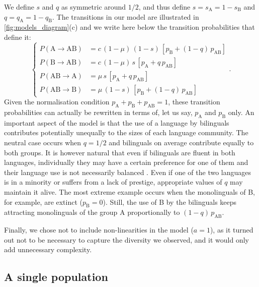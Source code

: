 \documentclass[../thesis.tex]{subfiles}
\begin{document}
We define $s$ and $q$ as symmetric around $1/2$, and thus define $s = s_\text{A} = 1 -
s_\text{B}$ and $q = q_\text{A} = 1 - q_\text{B}$. The transitions in our model are
illustrated in \cref{fig:models_diagram}(c) and we write here below the transition
probabilities that define it:
\begin{equation}
\label{eq:bipref_model}
\left\{
\begin{aligned}
    P (\text{A} \rightarrow \text{AB}) &= c \, (1 - \mu) \, (1-s) \, \left[ p_{\text{B}} + (1-q) \,  p_{\text{AB}} \right] \\
    P (\text{B} \rightarrow \text{AB}) &= c \, (1 - \mu) \, s \, \left[ p_{\text{A}} + q \, p_{\text{AB}} \right] \\
    P (\text{AB} \rightarrow \text{A}) &= \mu \, s \, \left[ p_{\text{A}} + q \, p_{\text{AB}} \right] \\
    P (\text{AB} \rightarrow \text{B}) &= \mu \, (1-s) \, \left[ p_{\text{B}} + (1-q) \, p_{\text{AB}} \right]
\end{aligned}
\right. .
\end{equation}
Given the normalisation condition $p_\text{A} + p_\text{B} + p_\text{AB} = 1$, these
transition probabilities can actually be rewritten in terms of, let us say, $p_\text{A}$
and $p_\text{B}$ only. An important aspect of the model is that the use of a language by
bilinguals contributes potentially unequally to the sizes of each language community.
The neutral case occurs when $q = 1/2$ and bilinguals on average contribute equally to
both groups. It is however natural that even if bilinguals are fluent in both languages,
individually they may have a certain preference for one of them and their language use
is not necessarily balanced \cite{RomaineBilingualMultilingual2012}. Even if one of the
two languages is in a minority or suffers from a lack of prestige, appropriate values of
$q$ may maintain it alive. The most extreme example occurs when the monolinguals of B,
for example, are extinct ($p_{\text{B}} = 0$). Still, the use of B by the bilinguals
keeps attracting monolinguals of the group A proportionally to $(1-q)\, p_{\text{AB}}$.

Finally, we chose not to include non-linearities in the model ($a = 1$), as it turned
out not to be necessary to capture the diversity we observed, and it would only add
unnecessary complexity.


\subsection{A single population}
\end{document}
